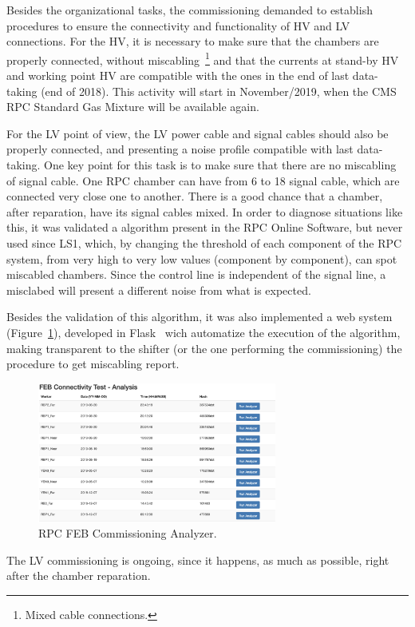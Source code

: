 Besides the organizational tasks, the commissioning demanded to establish procedures to ensure the connectivity and functionality of HV and LV connections. For the HV, it is necessary to make sure that the chambers are properly connected, without miscabling~\footnote{Mixed cable connections.} and that the currents at stand-by HV  and working point HV are compatible with the ones in the end of last data-taking (end of 2018). This activity will start in November/2019, when the CMS RPC Standard Gas Mixture will be available again.
 
For the LV point of view, the LV power cable and signal cables should also be properly connected, and presenting a noise profile compatible with last data-taking. One key point for this task is to make sure that there are no miscabling of signal cable. One RPC chamber can have from 6 to 18 signal cable, which are connected very close one to another. There is a good chance that a chamber, after reparation, have its signal cables mixed. In order to diagnose situations like this, it was validated a algorithm present in the RPC Online Software, but never used since LS1, which, by changing the threshold of each component of the RPC system, from very high to very low values (component by component), can spot miscabled chambers. Since the control line is independent of the signal line, a misclabed will present a different noise from what is expected.

Besides the validation of this algorithm, it was also implemented a web system (Figure~\ref{comm}), developed in Flask~\cite{flask} wich automatize the execution of the algorithm, making transparent to the shifter (or the one performing the commissioning) the procedure to get miscabling report.

\begin{figure}[h]
\begin{center}
\includegraphics[width=0.7\textwidth,keepaspectratio]{figures_and_tables/rpc/comm.png}
\end{center}
\caption{RPC FEB Commissioning Analyzer.}\label{comm}
\end{figure}

The LV commissioning is ongoing, since it happens, as much as possible, right after the chamber reparation.

\clearpage